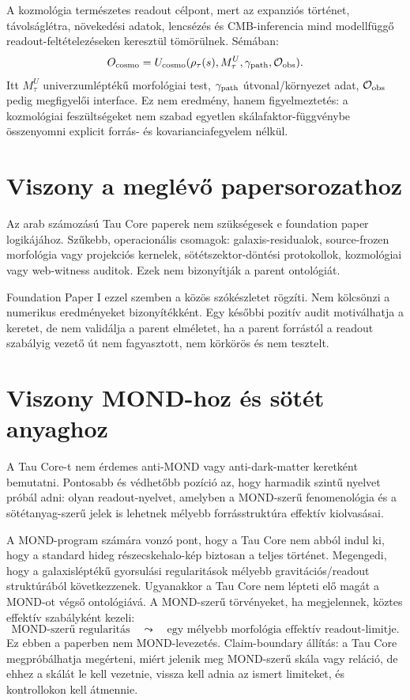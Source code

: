 \documentclass[12pt]{article}
\newcommand{\Rmap}{\rho_{\tau}}
\newcommand{\Mta}{M_{\tau}}
\begin{document}
A kozmológia természetes readout célpont, mert az expanziós történet,
távolságlétra, növekedési adatok, lencsézés és CMB-inferencia mind
modellfüggő readout-feltételezéseken keresztül tömörülnek.  Sémában:
\begin{equation}
  O_{\rm cosmo}
  =
  U_{\rm cosmo}(\Rmap(s),\Mta^U,\gamma_{\rm path},\mathcal O_{\rm obs}).
\end{equation}
Itt \(\Mta^U\) univerzumléptékű morfológiai test, \(\gamma_{\rm path}\)
útvonal/környezet adat, \(\mathcal O_{\rm obs}\) pedig megfigyelői interface.
Ez nem eredmény, hanem figyelmeztetés: a kozmológiai feszültségeket nem szabad
egyetlen skálafaktor-függvénybe összenyomni explicit forrás- és kovarianciafegyelem
nélkül.

\section{Viszony a meglévő papersorozathoz}

Az arab számozású Tau Core paperek nem szükségesek e foundation paper logikájához.
Szűkebb, operacionális csomagok: galaxis-residualok, source-frozen morfológia
vagy projekciós kernelek, sötétszektor-döntési protokollok, kozmológiai vagy
web-witness auditok.  Ezek nem bizonyítják a parent ontológiát.

Foundation Paper I ezzel szemben a közös szókészletet rögzíti.  Nem kölcsönzi
a numerikus eredményeket bizonyítékként.  Egy későbbi pozitív audit motiválhatja
a keretet, de nem validálja a parent elméletet, ha a parent forrástól a readout
szabályig vezető út nem fagyasztott, nem körkörös és nem tesztelt.

\section{Viszony MOND-hoz és sötét anyaghoz}

A Tau Core-t nem érdemes anti-MOND vagy anti-dark-matter keretként bemutatni.
Pontosabb és védhetőbb pozíció az, hogy harmadik szintű nyelvet próbál adni:
olyan readout-nyelvet, amelyben a MOND-szerű fenomenológia és a
sötétanyag-szerű jelek is lehetnek mélyebb forrásstruktúra effektív
kiolvasásai.

A MOND-program számára vonzó pont, hogy a Tau Core nem abból indul ki, hogy a
standard hideg részecskehalo-kép biztosan a teljes történet.  Megengedi, hogy
a galaxisléptékű gyorsulási regularitások mélyebb gravitációs/readout
struktúrából következzenek.  Ugyanakkor a Tau Core nem lépteti elő magát a
MOND-ot végső ontológiává.  A MOND-szerű törvényeket, ha megjelennek,
köztes effektív szabályként kezeli:
\[
  \text{MOND-szerű regularitás}
  \quad\leadsto\quad
  \text{egy mélyebb morfológia effektív readout-limitje}.
\]
Ez ebben a paperben nem MOND-levezetés.  Claim-boundary állítás: a Tau Core
megpróbálhatja megérteni, miért jelenik meg MOND-szerű skála vagy reláció, de
ehhez a skálát le kell vezetnie, vissza kell adnia az ismert limiteket, és
kontrollokon kell átmennie.
\end{document}
